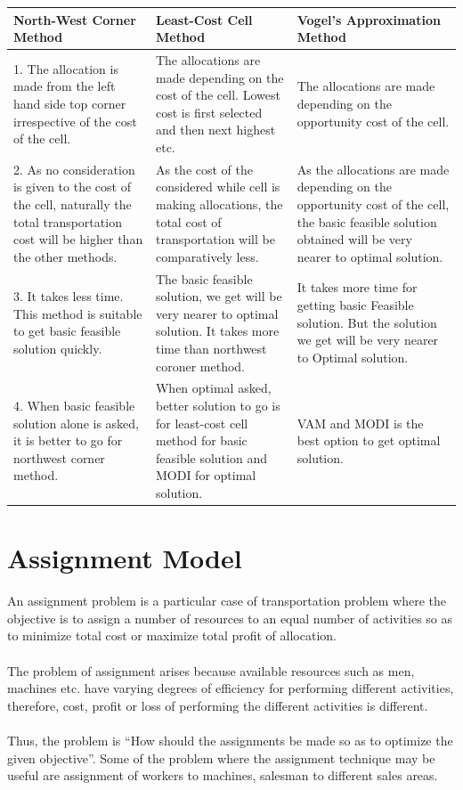 \begin{center}
	\begin{tabular}{| p{4cm} | p{4cm} | p{4cm} |}
	\hline
	North-West Corner Method & Least-Cost Cell Method & Vogel's Approximation Method\\ 
	\hline
	1. The allocation is made from the left hand side top corner irrespective of the cost of the cell. & The allocations are made depending on the cost of the cell. Lowest cost is first selected and then next highest etc. & The allocations are made depending on the opportunity cost of the cell.\\
	\hline
	2. As no consideration is given to the cost of the cell, naturally the total transportation cost will be higher than the other methods. & As the cost of the considered while cell is making allocations, the total cost of transportation will be comparatively less. & As the allocations are made depending on the opportunity cost of the cell, the basic feasible solution obtained will be very nearer to optimal solution.\\
	\hline
	3. It takes less time. This method is suitable to get basic feasible solution quickly. & The basic feasible solution, we get will be very
	nearer to optimal solution. It takes more time than northwest coroner method. & It takes more time for getting basic Feasible solution. But the solution we get will be very nearer to Optimal solution.\\
	\hline
	4. When basic feasible solution alone is asked, it is better
	to go for northwest corner method. & When optimal asked, better
	solution to go is for least-cost cell method for basic feasible solution and MODI for optimal solution. & VAM and MODI is the best option to get optimal solution.\\
	\hline
	\end{tabular}
\end{center}
%
\section{Assignment Model}
An assignment problem is a particular case of transportation problem where the objective is to assign a number of resources to an equal number of activities so as to minimize total cost or maximize total profit of allocation.\\\\
The problem of assignment arises because available resources such as men, machines etc. have varying degrees of efficiency for performing different activities, therefore, cost, profit or loss of performing the different activities is different.\\\\
Thus, the problem is “How should the assignments be made so as to optimize the given objective”. Some of the problem where the assignment technique may be useful are assignment of workers to machines, salesman to different sales areas.
